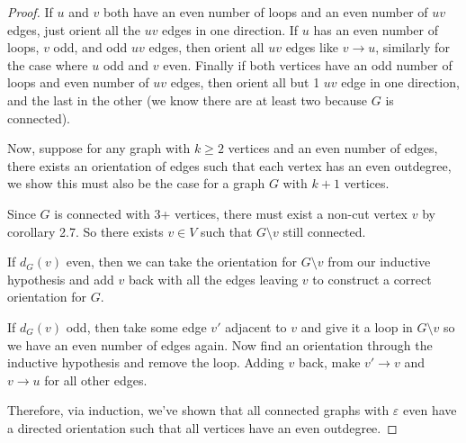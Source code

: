 \documentclass[11pt]{article}
\newcommand{\n}{\vspace{0.2cm}}
\begin{document}
\begin{enumerate}
\begin{enumerate}
\begin{proof}
            If \(u\) and \(v\) both have an even number of loops and an even number of \(uv\) edges, just orient all the \(uv\) edges in one direction.  If \(u\) has an even number of loops, \(v\) odd, and odd \(uv\) edges, then orient all \(uv\) edges like \(v \to u\), similarly for the case where \(u\) odd and \(v\) even.  Finally if both vertices have an odd number of loops and even number of \(uv\) edges, then orient all but 1 \(uv\) edge in one direction, and the last in the other (we know there are at least two because \(G\) is connected). \n

            Now, suppose for any graph with \(k \geq 2\) vertices and an even number of edges, there exists an orientation of edges such that each vertex has an even outdegree, we show this must also be the case for a graph \(G\) with \(k+1\) vertices. \n

            Since \(G\) is connected with 3+ vertices, there must exist a non-cut vertex \(v\) by corollary 2.7.  So there exists \(v \in V\) such that \(G \setminus v\) still connected. \n

            If \(d_G(v)\) even, then we can take the orientation for \(G \setminus v\) from our inductive hypothesis and add \(v\) back with all the edges leaving \(v\) to construct a correct orientation for \(G\). \n

            If \(d_G(v)\) odd, then take some edge \(v'\) adjacent to \(v\) and give it a loop in \(G \setminus v\) so we have an even number of edges again.  Now find an orientation through the inductive hypothesis and remove the loop.  Adding \(v\) back, make \(v' \to v\) and \(v \to u\) for all other edges. \n

            Therefore, via induction, we've shown that all connected graphs with \(\varepsilon\) even have a directed orientation such that all vertices have an even outdegree.
          \end{proof}
          
      \end{enumerate}
  \end{enumerate}
\end{document}
